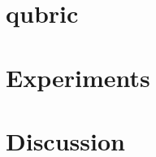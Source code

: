 \documentclass{article}
\begin{document}
\section{qubric}
\label{sec:method}

\section{Experiments}
\label{sec:experiments}

\section{Discussion}
\label{sec:discussion}



\end{document}
